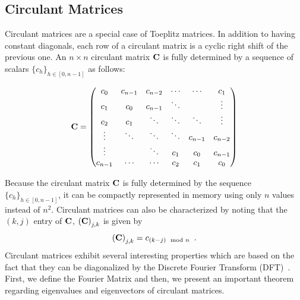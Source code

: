 \subsection{Circulant Matrices}
\label{subsection:ch2-circulant_matrices}

Circulant matrices are a special case of Toeplitz matrices.
In addition to having constant diagonals, each row of a circulant matrix is a cyclic right shift of the previous one.
An $n \times n$ circulant matrix $\mathbf{C}$ is fully determined by a sequence of scalars $\{c_h\}_{h \in [0,n-1]}$ as follows:

\begin{equation}
  \mathbf{C} =
  \begin{pmatrix}
    c_0 & c_{n-1} & c_{n-2} & \cdots & \cdots & c_{1} \\
    c_{1} & c_0 & c_{n-1} & \ddots & & \vdots \\
    c_{2} & c_{1} & \ddots & \ddots & \ddots & \vdots \\
    \vdots & \ddots & \ddots & \ddots & c_{n-1} & c_{n-2} \\
    \vdots & & \ddots & c_{1} & c_{0} & c_{n-1} \\
    c_{n-1} & \cdots & \cdots & c_{2} & c_{1} & c_0
  \end{pmatrix}
\end{equation}

Because the circulant matrix $\mathbf{C}$ is fully determined by the sequence $\{c_h\}_{h \in [0,n-1]}$, it can be compactly represented in memory using only $n$ values instead of $n^2$.
Circulant matrices can also be characterized by noting that the $(k,j)$ entry of $\mathbf{C}$, $\leftmat \Cmat \rightmat_{j,k}$ is given by
\begin{equation}
  \leftmat \Cmat \rightmat_{j,k} = c_{\left(k-j\right) \mod n} \enspace.
\end{equation}
Circulant matrices exhibit several interesting properties which are based on the fact that they can be diagonalized by the Discrete Fourier Transform (DFT)~\cite{davis1979circulant}.
First, we define the Fourier Matrix and then, we present an important theorem regarding eigenvalues and eigenvectors of circulant matrices.

